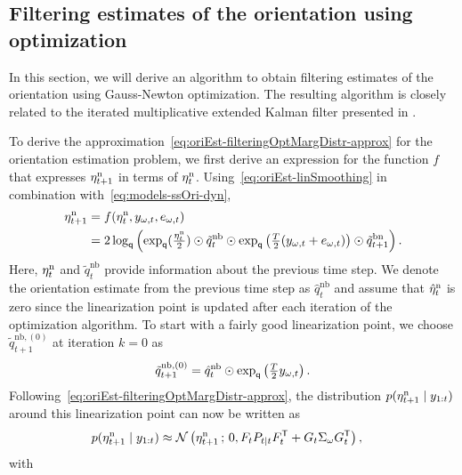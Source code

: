 \subsection{Filtering estimates of the orientation using optimization}
\label{sec:oriEst-filteringOpt-ori}
In this section, we will derive an algorithm to obtain filtering estimates of the orientation using Gauss-Newton optimization. The resulting algorithm is closely related to the iterated multiplicative extended Kalman filter presented in \cite{skoglundSK:2017}.

To derive the approximation~\eqref{eq:oriEst-filteringOptMargDistr-approx} for the orientation estimation problem, we first derive an expression for the function $f$ that expresses $\eta_{t+1}^\text{n}$ in terms of $\eta^\text{n}_{t}$. Using~\eqref{eq:oriEst-linSmoothing} in combination with~\eqref{eq:models-ssOri-dyn}, 
\begin{align}
\eta^\text{n}_{t+1} &= f(\eta^\text{n}_{t}, y_{\omega,t}, e_{\omega,t}) \\ 
&= 2 \log_\mathsf{q} \left( \exp_\mathsf{q}(\tfrac{\eta^\text{n}_{t}}{2}) \odot \tilde{q}_{t}^\text{nb} \odot \exp_\mathsf{q} \left(\tfrac{T}{2} (y_{\omega,t} + e_{\omega,t} ) \right) \odot \tilde{q}_{t+1}^\text{bn} \right). \nonumber
\label{eq:oriEst-filtOptCost}
\end{align}
Here, $\eta^\text{n}_{t}$ and $\tilde{q}_{t}^\text{nb}$ provide information about the previous time step. We denote the orientation estimate from the previous time step as $\hat{q}_{t}^\text{nb}$ and assume that $\hat{\eta}_t^\text{n}$ is zero since the linearization point is updated after each iteration of the optimization algorithm. To start with a fairly good linearization point, we choose $\tilde{q}_{t+1}^{\text{nb},(0)}$ at iteration $k = 0$ as
\begin{align}
\tilde{q}_{t+1}^{\text{nb},(0)} = \hat{q}_{t}^\text{nb} \odot \exp_\mathsf{q} \left( \tfrac{T}{2} y_{\omega,t} \right).
\end{align}
Following~\eqref{eq:oriEst-filteringOptMargDistr-approx}, the distribution $p(\eta^\text{n}_{t+1} \mid y_{1:t})$ around this linearization point can now be written as
\begin{align}
\label{eq:oriEst-filtOptDist}
p(\eta^\text{n}_{t+1} \mid y_{1:t}) &\approx \mathcal{N}\left( \eta^\text{n}_{t+1} \, ; \, 0, F_{t} P_{t \mid t} F_{t}^{\mathsf{T}} + G_{t} \Sigma_\omega G_{t}^{\mathsf{T}} \right),
\end{align}
with 
